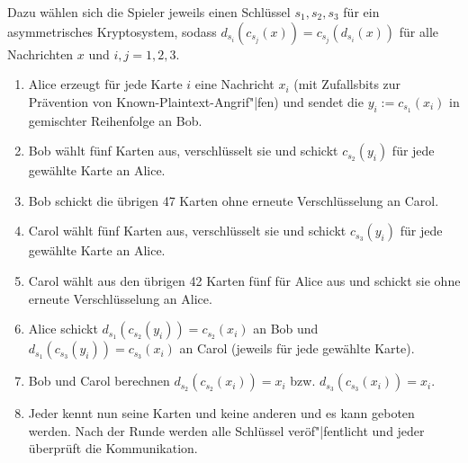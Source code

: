 Dazu wählen sich die Spieler jeweils einen Schlüssel $s_1, s_2, s_3$
für ein asymmetrisches Kryptosystem, sodass $d_{s_i}(c_{s_j}(x)) = c_{s_j}(d_{s_i}(x))$
für alle Nachrichten $x$ und $i, j = 1, 2, 3$.
\begin{enumerate}
    \item
    Alice erzeugt für jede Karte $i$ eine Nachricht $x_i$
    (mit Zufallsbits zur Prävention von Known-Plaintext-Angrif"|fen)
    und sendet die $y_i := c_{s_1}(x_i)$ in gemischter Reihenfolge an Bob.
    
    \item
    Bob wählt fünf Karten aus, verschlüsselt sie und schickt $c_{s_2}(y_i)$ für jede
    gewählte Karte an Alice.
    
    \item
    Bob schickt die übrigen 47 Karten ohne erneute Verschlüsselung an Carol.
    
    \item
    Carol wählt fünf Karten aus, verschlüsselt sie und schickt $c_{s_3}(y_i)$ für jede
    gewählte Karte an Alice.
    
    \item
    Carol wählt aus den übrigen 42 Karten fünf für Alice aus
    und schickt sie ohne erneute Verschlüsselung an Alice.
    
    \item
    Alice schickt $d_{s_1}(c_{s_2}(y_i)) = c_{s_2}(x_i)$ an Bob und
    $d_{s_1}(c_{s_3}(y_i)) = c_{s_3}(x_i)$ an Carol (jeweils für jede gewählte Karte).
    
    \item
    Bob und Carol berechnen $d_{s_2}(c_{s_2}(x_i)) = x_i$ bzw. $d_{s_3}(c_{s_3}(x_i)) = x_i$.
    
    \item
    Jeder kennt nun seine Karten und keine anderen und es kann geboten werden.
    Nach der Runde werden alle Schlüssel veröf"|fentlicht und jeder überprüft die Kommunikation.
\end{enumerate}

\pagebreak

